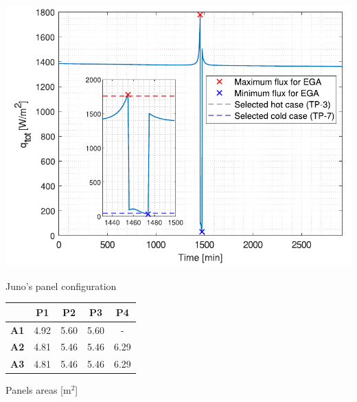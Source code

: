 \begin{minipage}{0.5\linewidth}
    \centering
    \captionsetup{type=figure}
    \includegraphics[width=\linewidth]{Images/EGA_flux_analysis.pdf}
    \caption{Juno's panel configuration}
    \label{fig:panel_config}
\end{minipage}\hfill
\begin{minipage}{0.5\linewidth}
    \centering
    \captionsetup{type=table}
    \renewcommand{\arraystretch}{1.4}
    \begin{tabular}{|c|c|c|c|c|}
        \hline
        &  \textbf{P1}  & \textbf{P2} & \textbf{P3} & \textbf{P4}\\
        \hline
        \hline
        \textbf{A1}      & 4.92 & 5.60 & 5.60 & - \\
        \hline
        \textbf{A2}      & 4.81 & 5.46 & 5.46 & 6.29  \\
        \hline
        \textbf{A3}     & 4.81 & 5.46 & 5.46 & 6.29  \\
        \hline
    \end{tabular}
    \caption{Panels areas [m$^2$]}
    \label{table:panels_area}
\end{minipage}




